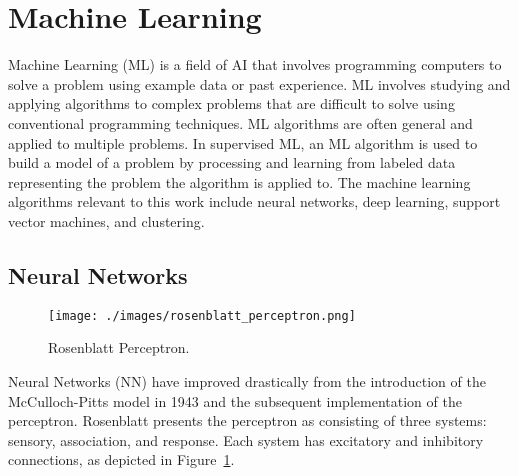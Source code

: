 \section{Machine Learning}

Machine Learning (ML) is a field of AI that involves programming computers to
solve a problem using example data or past
experience\cite{alpaydin2014introduction}. ML involves studying and applying
algorithms to complex problems that are difficult to solve using conventional
programming techniques. ML algorithms are often general and applied to multiple
problems. In supervised ML, an ML algorithm is used to build a model of a
problem by processing and learning from labeled data representing the problem
the algorithm is applied to\cite{rebala2019machine, alpaydin2014introduction}.
The machine learning algorithms relevant to this work include neural networks,
deep learning, support vector machines, and clustering.

\subsection{Neural Networks}


\begin{figure}[h]
    \texttt{[image: ./images/rosenblatt\_perceptron.png]}
    \caption{Rosenblatt Perceptron\cite{rosenblatt1957perceptron}.}
    \label{fig:rosenblatt_perceptron}
\end{figure}

Neural Networks (NN) have improved drastically from the introduction of the
McCulloch-Pitts model in 1943\cite{McCulloch1943-MCCALC-5} and the subsequent
implementation of the perceptron\cite{rosenblatt1957perceptron, 4066017}.
Rosenblatt presents the perceptron as consisting of three systems: sensory,
association, and response. Each system has excitatory and inhibitory
connections, as depicted in Figure~\ref{fig:rosenblatt_perceptron}.


